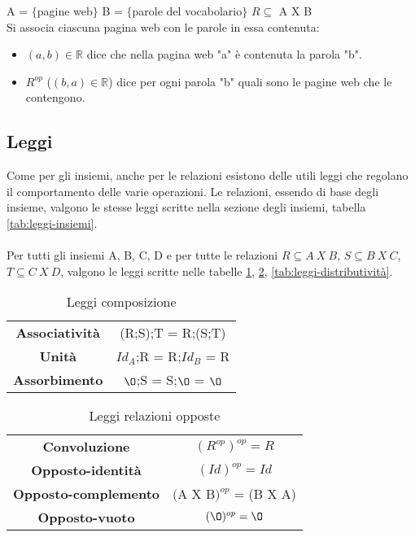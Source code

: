 \begin{example}
    A = $\{$pagine web$\}$ \hspace{.5cm} B = $\{$parole del vocabolario$\}$ \hspace{.5cm} $R \subseteq$ A X B\\
    Si associa ciascuna pagina web con le parole in essa contenuta:
    \begin{itemize}
        \item $(a,b) \in \mathbb{R}$ dice che nella pagina web "a" è contenuta la parola "b".
        \item $R^{op}$ ($(b,a) \in \mathbb{R}$) dice per ogni parola "b" quali sono le pagine web che le contengono.
    \end{itemize}
\end{example}

\subsection{Leggi}
Come per gli insiemi, anche per le relazioni esistono delle utili leggi che regolano il comportamento delle varie operazioni. Le relazioni, essendo di base degli insieme, valgono le stesse leggi scritte nella sezione degli insiemi, tabella \ref{tab:leggi-insiemi}. \\ \\
Per tutti gli insiemi A, B, C, D e per tutte le relazioni $R \subseteq A \: X \: B$, $S \subseteq B \: X \: C$, $T \subseteq C \: X \: D$, valgono le leggi scritte nelle tabelle \ref{tab:leggi-composizione}, \ref{tab:leggi-relazioni-opposte}, \ref{tab:leggi-distributività}.
\begin{table}[h!]
    \setlength{\tabcolsep}{8pt}
    \renewcommand{\arraystretch}{2}
    \centering
    \begin{tabular}{|c|c|}
    \hline
        \textbf{Associatività} & (R;S);T = R;(S;T) \\ 
        \textbf{Unità} & $Id_A$;R = R;$Id_B$ = R \\
        \textbf{Assorbimento} & $\O$;S = S;$\O$ = $\O$ \\ \hline
    \end{tabular}
    \caption{Leggi composizione}
    \label{tab:leggi-composizione}
\end{table}
\begin{table}[h!]
    \vspace{-10pt}
    \centering
    \setlength{\tabcolsep}{8pt}
    \renewcommand{\arraystretch}{2}
    \begin{tabular}{|c|c|}
        \hline
        \textbf{Convoluzione} & $(R^{op})^{op} = R$ \\
        \textbf{Opposto-identità} & $(Id)^{op} = Id$ \\
        \textbf{Opposto-complemento} & $($A X B$)^{op}$ = (B X A) \\
        \textbf{Opposto-vuoto} & $(\O)^{op} = \O$ \\ \hline
    \end{tabular}
    \caption{Leggi relazioni opposte}
    \label{tab:leggi-relazioni-opposte}
\end{table}
